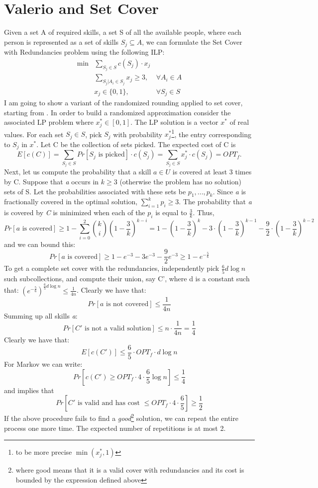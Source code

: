 \section{Valerio and Set Cover}
Given a set A of required skills, a set S of all the available people, where each person is represented as a set of skills $S_j \subseteq A$, we can formulate the Set Cover with Redundancies problem using the following ILP:
\begin{align*}
\min&\sum_{S_j \in S} c(S_j) \cdot x_j \\
&\sum_{S_j | A_i \in S_j} x_j \geq 3, & \forall A_i \in A \\
&x_j \in \{0, 1\}, & \forall S_j \in S
\end{align*}
I am going to show a variant of the randomized rounding applied to set cover, starting from \cite{Vazirani}.
In order to build a randomized approximation consider the associated LP problem where $x^*_j \in [0, 1]$. The LP solution is a vector $x^*$ of real values.
For each set $S_j \in S$, pick $S_j$ with probability $x^*_j$\footnote{to be more precise $\min(x^*_j, 1)$}, the entry corresponding to $S_j$ in $x^*$. Let C be the collection of sets picked. The expected cost of C is
\[
E[c(C)] = \sum_{S_j \in S} Pr[S_j \text{ is picked}] \cdot c(S_j) = \sum_{S_j \in S} x^*_j \cdot c(S_j) = OPT_f.
\]
Next, let us compute the probability that a skill $a \in U$ is covered at least 3 times by C. Suppose that \textit{a} occurs in $k \geq 3$ (otherwise the problem has no solution) sets of S. Let the probabilities associated with these sets be $p_1, ..., p_k.$ Since \textit{a} is fractionally covered in the optimal solution, $\sum_{i=1}^{k} p_i \geq 3.$ The probability that \textit{a} is covered by \textit{C} is minimized when each of the $p_i$ is equal to $\frac{3}{k}.$ Thus,
\[
Pr[a \text{ is covered}] \geq  1 - \sum_{i=0}^{2} \binom{k}{i} (1-\frac{3}{k})^{k-i} = 1 - (1-\frac{3}{k})^k - 3 \cdot (1-\frac{3}{k})^{k-1} - \frac{9}{2}\cdot (1-\frac{3}{k})^{k-2}
\]
and we can bound this:
\[
Pr[a \text{ is covered}] \geq 1 - e^{-3} - 3e^{-3} - \frac{9}{2} e^{-3} \geq 1- e^{-\frac{5}{6}}
\]
To get a complete set cover with the redundancies, independently pick $\frac{6}{5}d \log n$ such subcollections, and compute their union, say C', where d is a constant such that:
$({e^{-\frac{5}{6}}})^{\frac{6}{5} d\log n} \leq \frac{1}{4n}$. Clearly we have that:
\[
Pr[a \text{ is not covered}] \leq \frac{1}{4n}
\]
Summing up all skills \textit{a}:
\[
Pr[C' \text{ is not a valid solution}] \leq n \cdot \frac{1}{4n} = \frac{1}{4}
\]
Clearly we have that:
\[
E[c(C')] \leq \frac{6}{5} \cdot OPT_f \cdot d \log n
\]
For Markov we can write:
\[
Pr[c(C') \geq OPT_f \cdot 4\cdot \frac{6}{5} \log n] \leq \frac{1}{4}
\]
and implies that
\[
Pr[C' \text{ is valid and has cost } \leq OPT_f \cdot 4\cdot \frac{6}{5}] \geq \frac{1}{2}
\]
If the above procedure fails to find a \textit{good}\footnote{where good means that it is a valid cover with redundancies and its cost is bounded by the expression defined above} solution, we can repeat the entire process one more time. The expected number of repetitions is at most 2.